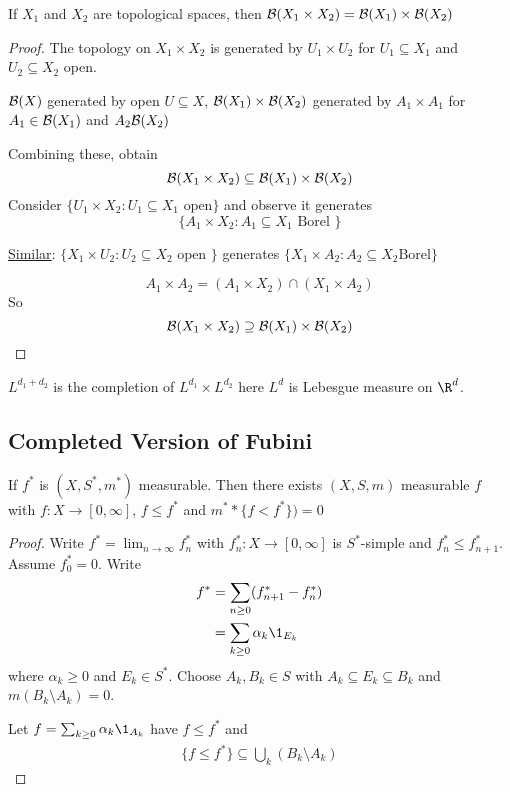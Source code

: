 \begin{lemma}
	If $X_1$ and $X_2$ are topological spaces, then $\mathcal{B}(X_1 \times X_2) = \mathcal{B}(X_1) \times \mathcal{B}(X_2)$
\end{lemma}

\begin{proof}
	The topology on $X_1 \times X_2$ is generated by $U_1 \times U_2$ for $U_1 \subseteq X_1$ and $U_2 \subseteq X_2$ open.

	$\mathcal{B}(X)$ generated by open $U \subseteq X$, $\mathcal{B}(X_1) \times \mathcal{B}(X_2)$ generated by $A_1 \times A_1$ for
	$A_1 \in \mathcal{B}(X_1)$ and $A_2 \mathcal{B}(X_2)$

	Combining these, obtain
	 \[
		\mathcal{B}(X_1 \times X_2) \subseteq \mathcal{B}(X_1) \times \mathcal{B}(X_2)
	\]
	Consider $\{U_1 \times X_2 : U_1 \subseteq X_1 \text{ open} \}$
	and observe it generates
	\[
		\{A_1 \times X_2 : A_1 \subseteq X_1 \text{ Borel } \}
	\]

	\underline{Similar}: $\{ X_1 \times U_2 : U_2 \subseteq X_2 \text{ open }\}$
	generates $\{ X_1 \times A_2 : A_2 \subseteq X_2 \text{Borel} \}$

	\[
		A_1 \times A_2 = (A_1 \times X_2 ) \cap (X_1 \times A_2)
	\] So
	\[
		\mathcal{B}(X_1 \times X_2 ) \supseteq \mathcal{B}(X_1) \times \mathcal{B}(X_2)
	\]
\end{proof}

\begin{corollary}
	$L^{d_1 + d_2}$ is the completion of $L^{d_1} \times L^{d_2}$ here $L^d$ is Lebesgue measure on $\R^d$.
\end{corollary}

\subsection{Completed Version of Fubini}

\begin{lemma} If $f^*$ is  $(X, S^*, m^*)$ measurable.
	Then there exists $(X, S, m)$ measurable $f$ with $f: X \to [0,\infty]$, $f \leq f^*$ and $m^* * \{f < f^* \}) = 0$
\end{lemma}

\begin{proof}
	Write $f^* = \lim_{n \to \infty} f_n^*$ with $f_{n}^* : X \to [0, \infty]$ is $S^*$-simple and
	$f_n^* \leq f_{n+1}^*$.
	Assume $f_{0}^* = 0$. Write
	\begin{align*}
		f^* &= \sum_{n \geq 0} (f_{n+1}^* - f_n^*) \\
			&= \sum_{k \geq 0} \alpha_{k} \1_{E_k}
	\end{align*}
	where $\alpha_k \geq 0$ and $E_k \in S^*$. Choose $A_k, B_k \in S$ with $A_k \subseteq E_k \subseteq B_k$ and
	$m(B_k \setminus A_k) = 0$.

	Let $f = \sum_{k \geq 0} \alpha_{k} \1_{A_k}$ have $f \leq f^*$ and
	\begin{align*}
		\{ f \leq f^* \} \subseteq \bigcup_{k} (B_{k} \setminus A_k)
	\end{align*}
\end{proof}


